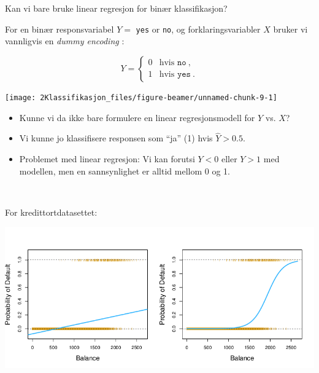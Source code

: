\documentclass[10pt,ignorenonframetext,]{beamer}
\providecommand{\tightlist}{%
  \setlength{\itemsep}{0pt}\setlength{\parskip}{0pt}}
\begin{document}
\begin{frame}[fragile]

\begin{block}{Kan vi bare bruke linear regresjon for binær
klassifikasjon?}

\vspace{1mm}

For en binær responsvariabel \(Y =\) \texttt{yes} or \texttt{no}, og
forklaringsvariabler \(X\) bruker vi vannligvis en \emph{dummy encoding}
:

\[Y = \left\{ \begin{array}{ll}
0 & \text{hvis  } \texttt{no} \ , \\
1 & \text{hvis  } \texttt{yes} \ .
\end{array} \right.\]

\vspace{6mm}

\begin{center}\texttt{[image: 2Klassifikasjon\_files/figure-beamer/unnamed-chunk-9-1]} \end{center}

\end{block}

\end{frame}

\begin{frame}

\begin{itemize}
\item
  Kunne vi da ikke bare formulere en linear regresjonsmodell for \(Y\)
  vs. \(X\)?
\item
  Vi kunne jo klassifisere responsen som ``ja'' (1) hvis
  \(\hat{Y}> 0.5\).
\end{itemize}

\vspace{2mm}

\begin{itemize}
\tightlist
\item
  Problemet med linear regresjon: Vi kan forutsi \(Y<0\) eller \(Y>1\)
  med modellen, men en sannsynlighet er alltid mellom 0 og 1.
\end{itemize}

\(~\)

For kredittortdatasettet: \vspace{-2mm}

\includegraphics{4.2.png}

\end{frame}
\end{document}
